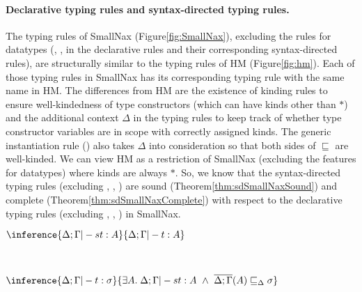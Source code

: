 \paragraph{Declarative typing rules and syntax-directed typing rules.}
The typing rules of SmallNax (Figure\;\ref{fig:SmallNax}),
excluding the rules for datatypes (, ,
 in the declarative rules and their corresponding
syntax-directed rules), are structurally similar to the typing rules of HM
(Figure\;\ref{fig:hm}). Each of those typing rules in SmallNax has
its corresponding typing rule with the same name in HM.
The differences from HM are the existence of kinding rules to ensure
well-kindedness of type constructors (which can have kinds other than $*$)
and the additional context $\Delta$ in the typing rules to keep track of
whether type constructor variables are in scope with correctly assigned kinds.
The generic instantiation rule () also takes $\Delta$ into
consideration so that both sides of $\sqsubseteq$ are well-kinded. We can view
HM as a restriction of SmallNax (excluding the features for datatypes) where
kinds are always $*$. So, we know that the syntax-directed typing rules
(excluding , , )
are sound (Theorem\;\ref{thm:sdSmallNaxSound}) and
complete (Theorem\;\ref{thm:sdSmallNaxComplete})
with respect to the declarative typing rules
(excluding , , ) in SmallNax.
\begin{theorem}
$ \inference{\Delta;\Gamma |-s t : A}{\Delta;\Gamma |- t : A} $
\label{thm:sdSmallNaxSound}
\end{theorem}
\begin{theorem} ~
\begin{center}
$ \inference{\Delta;\Gamma |- t : \sigma}{
	\exists A.\;\Delta;\Gamma |-s t : A ~\land~
	\overline{\Delta;\Gamma}(A) \sqsubseteq_\Delta \sigma} $
\end{center}
\label{thm:sdSmallNaxComplete}
\end{theorem}

